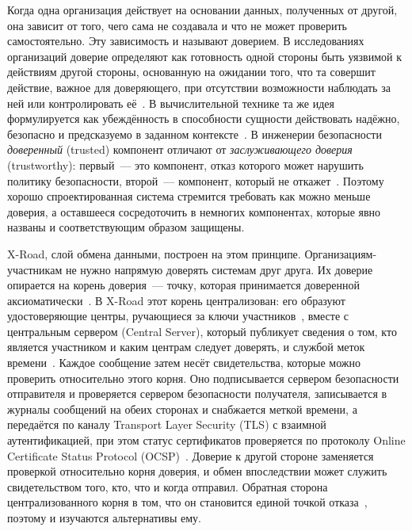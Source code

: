 \documentclass[conference,a4paper]{IEEEtran}
\begin{document}
Когда одна организация действует на основании данных, полученных от другой, она зависит от того, чего
сама не создавала и что не может проверить самостоятельно. Эту зависимость и называют доверием. В
исследованиях организаций доверие определяют как готовность одной стороны быть уязвимой к
действиям другой стороны, основанную на ожидании того, что та совершит действие, важное для
доверяющего, при отсутствии возможности наблюдать за ней или контролировать её~\cite{mayer1995}. В
вычислительной технике та же идея формулируется как убеждённость в способности сущности действовать
надёжно, безопасно и предсказуемо в заданном контексте~\cite{grandison2000}. В инженерии безопасности
\emph{доверенный} (trusted) компонент отличают от \emph{заслуживающего доверия} (trustworthy): первый~---
это компонент, отказ которого может нарушить политику безопасности, второй~--- компонент, который
не откажет~\cite{anderson2020}. Поэтому хорошо спроектированная система стремится требовать как можно
меньше доверия, а оставшееся сосредоточить в немногих компонентах, которые явно названы и
соответствующим образом защищены.

X-Road, слой обмена данными, построен на этом принципе. Организациям-участникам не нужно напрямую
доверять системам друг друга. Их доверие опирается на корень доверия~--- точку, которая принимается
доверенной аксиоматически~\cite{bakhtina2023sac}. В X-Road этот корень централизован: его образуют
удостоверяющие центры, ручающиеся за ключи участников~\cite{bakhtina2023sac}, вместе с
центральным сервером (Central Server), который публикует сведения о том, кто является участником и
каким центрам следует доверять, и службой меток времени~\cite{xroadarcss}. Каждое сообщение затем
несёт свидетельства, которые можно проверить относительно этого корня. Оно подписывается сервером
безопасности отправителя и проверяется сервером безопасности получателя, записывается в журналы
сообщений на обеих сторонах и снабжается меткой времени, а передаётся по каналу Transport Layer
Security (TLS) с взаимной аутентификацией, при этом статус сертификатов проверяется по протоколу
Online Certificate Status Protocol (OCSP)~\cite{xroadarcss,ansper2013}. Доверие к другой стороне
заменяется проверкой относительно корня доверия, и обмен впоследствии может служить
свидетельством того, кто, что и когда отправил. Обратная сторона централизованного корня в том, что он
становится единой точкой отказа~\cite{bakhtina2023sac}, поэтому и изучаются альтернативы ему.
\end{document}
